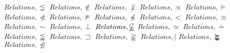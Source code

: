 \documentclass{article}
\begin{document}
\linebreak
$Relations,\lnsim$
\linebreak
\linebreak
$Relations,\notin$
\linebreak
\linebreak
$Relations,\not\perp$
\linebreak
\linebreak
$Relations,\propto$
\linebreak
\linebreak
$Relations,\models$
\linebreak
\linebreak
$Relations,\ntriangleleft$
\linebreak
\linebreak
$Relations,\nvDash$
\linebreak
\linebreak
$Relations,\npreceq$
\linebreak
\linebreak
$Relations,<$
\linebreak
\linebreak
$Relations,\equiv$
\linebreak
\linebreak
$Relations,\sim$
\linebreak
\linebreak
$Relations,\perp$
\linebreak
\linebreak
$Relations,\nsubseteqq$
\linebreak
\linebreak
$Relations,\simeq$
\linebreak
\linebreak
$Relations,\doteq$
\linebreak
\linebreak
$Relations,\lnapprox$
\linebreak
\linebreak
$Relations,\sqsupset$
\linebreak
\linebreak
$Relations,\gnapprox$
\linebreak
\linebreak
$Relations,\mid$
\linebreak
\linebreak
$Relations,\succnapprox$
\linebreak
\linebreak
$Relations,\ntrianglelefteq$
\linebreak
\linebreak
\end{document}
